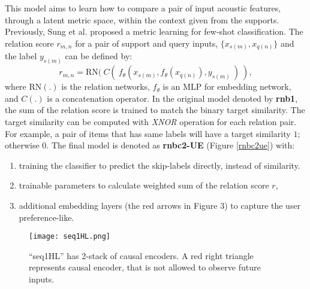 This model aims to learn how to compare a pair of input acoustic features, through a latent metric space, within the context given from the supports. Previously, Sung et al.\cite{sung2018learning} proposed a metric learning for few-shot classification. The relation score $r_{m,n}$ for a pair of support and query inputs, $\{x_{s(m)}, x_{q(n)}\}$ and the label $y_{s(m)}$ can be defined by:
\begin{equation}
    r_{m,n} = \text{RN}(~C(~f_\theta(x_{s(m)}, f_\theta(x_{q(n)}), y_{s(m)}~)~),
\end{equation}
where RN$(.)$ is the relation networks\cite{santoro2017simple}, $f_\theta$ is an MLP for embedding network, and $C(.)$ is a concatenation operator. In the original model\cite{sung2018learning} denoted by \textbf{rnb1}, the sum of the relation score is trained to match the binary target similarity. The target similarity can be computed with {\it XNOR} operation for each relation pair. For example, a pair of items that has same labels will have a target similarity $1$; otherwise $0$. The final model is denoted as \textbf{rnbc2-UE} (Figure \ref{rnbc2ue}) with:
\begin{enumerate}
    \item training the classifier to predict the skip-labels directly, instead of similarity.
    \item trainable parameters to calculate weighted sum of the relation score $r$,
    \item additional embedding layers (the red arrows in Figure 3) to capture the user preference-like.
\end{enumerate}


\begin{figure}
\texttt{[image: seq1HL.png]}
\caption{``seq1HL'' has 2-stack of causal encoders. A red right triangle represents causal encoder, that is not allowed to observe future inputs.}
\label{seq1hl}
\end{figure}


